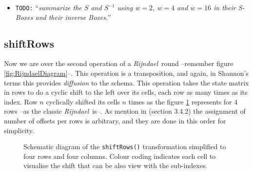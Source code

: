 \documentclass[10pt,a4paper,twoside]{llncs}
\newcommand{\todo}[1]{\texttt{\color{red}TODO:} ``\emph{#1}''}
\newcommand{\fixme}[1]{\texttt{\color{red}FIXME:} ``\emph{#1}''}
\newcommand{\rijndael}{\emph{Rijndael}}
\newcommand{\Fpn}[2]{\ensuremath{\mathbb{F}_{#1^#2}}}
\newcommand{\Fpnm}[2]{\ensuremath{\frac{\Fpn{2}{#1}[#2]}{m(#2)}}}
\begin{document}
\begin{itemize}
\begin{itemize}
\begin{itemize}
   \item \todo{Rule to chose the others, specially odds wordsizes but also bigger than $8$}.
  \end{itemize}
  \item build $g(z)$ in \Fpnm{w}{z}
  \item build $f(z)$ and $f^{-1}(z)$ in \Fpnm{w}{z}
  \begin{itemize}
   \item How to chose the circulant matrix from $b$ of equation \ref{eq:subBytes:affine} used in equation \ref{eq:subBytes:matrix} and the $c$ (and also for the inverse)?
  \end{itemize}
 \end{itemize}
 \item \todo{summarize the $S$ and $S^{-1}$ using $w=2$, $w=4$ and $w=16$ in their \emph{S-Box}es and their inverse Boxes.}
\end{itemize}


\subsection{shiftRows}\label{sec:shiftRows}
Now we are over the second operation of a \rijndael\, round --remember figure \ref{fig:RijndaelDiagram}--. This operation is a transposition, and again, in Shannon's terms this provides \emph{diffusion} to the schema. This operation takes the state matrix in rows to do a cyclic shift to the left over its cells, each row as many times as its index. Row $n$ cyclically shifted its cells $n$ times as the figure \ref{fig:shiftRows} represents for 4 rows --as the classic \rijndael\, is--. As mention in \cite{Daemen:2002:DR:560131} (section 3.4.2) the assignment of number of offsets per rows is arbitrary, and they are done in this order for simplicity.


\begin{figure}[ht]
\begin{center}

\caption{Schematic diagram of the {\tt shiftRows()} transformation simplified to four rows and four columns. Colour coding indicates each cell to visualise the shift that can be also view with the sub-indexes.}%
\label{fig:shiftRows}
\end{center}
\end{figure}
\end{document}

